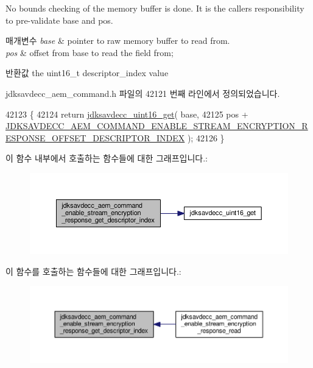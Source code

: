 No bounds checking of the memory buffer is done. It is the caller\textquotesingle{}s responsibility to pre-\/validate base and pos.


\begin{DoxyParams}{매개변수}
{\em base} & pointer to raw memory buffer to read from. \\
\hline
{\em pos} & offset from base to read the field from; \\
\hline
\end{DoxyParams}
\begin{DoxyReturn}{반환값}
the uint16\+\_\+t descriptor\+\_\+index value 
\end{DoxyReturn}


jdksavdecc\+\_\+aem\+\_\+command.\+h 파일의 42121 번째 라인에서 정의되었습니다.


\begin{DoxyCode}
42123 \{
42124     \textcolor{keywordflow}{return} \hyperlink{group__endian_ga3fbbbc20be954aa61e039872965b0dc9}{jdksavdecc\_uint16\_get}( base,
42125                                   pos + 
      \hyperlink{group__command__enable__stream__encryption__response_gae059f03d3ab54a7312dc7c2166bdd147}{JDKSAVDECC\_AEM\_COMMAND\_ENABLE\_STREAM\_ENCRYPTION\_RESPONSE\_OFFSET\_DESCRIPTOR\_INDEX}
       );
42126 \}
\end{DoxyCode}


이 함수 내부에서 호출하는 함수들에 대한 그래프입니다.\+:
\nopagebreak
\begin{figure}[H]
\begin{center}
\leavevmode
\includegraphics[width=350pt]{group__command__enable__stream__encryption__response_gaa66dbd40bc9dfb7b6e4980478ea1536b_cgraph}
\end{center}
\end{figure}




이 함수를 호출하는 함수들에 대한 그래프입니다.\+:
\nopagebreak
\begin{figure}[H]
\begin{center}
\leavevmode
\includegraphics[width=350pt]{group__command__enable__stream__encryption__response_gaa66dbd40bc9dfb7b6e4980478ea1536b_icgraph}
\end{center}
\end{figure}


